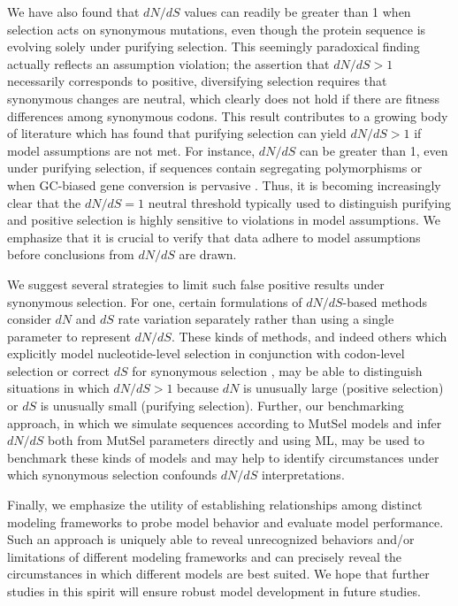 \documentclass[11pt]{article}
\begin{document}
We have also found that $dN/dS$ values can readily be greater than 1 when selection acts on synonymous mutations, even though the protein sequence is evolving solely under purifying selection. This seemingly paradoxical finding actually reflects an assumption violation; the assertion that $dN/dS > 1$ necessarily corresponds to positive, diversifying selection requires that synonymous changes are neutral, which clearly does not hold if there are fitness differences among synonymous codons. This result contributes to a growing body of literature which has found that purifying selection can yield $dN/dS > 1$ if model assumptions are not met. For instance, $dN/dS$ can be greater than 1, even under purifying selection, if sequences contain segregating polymorphisms \citep{Rochaetal2006,KryazhimskiyPlotkin2008,Mugaletal2014} or when GC-biased gene conversion is pervasive \citep{Ratnakumaretal2010}. Thus, it is becoming increasingly clear that the $dN/dS = 1$ neutral threshold typically used to distinguish purifying and positive selection is highly sensitive to violations in model assumptions. We emphasize that it is crucial to verify that data adhere to model assumptions before conclusions from $dN/dS$ are drawn.

We suggest several strategies to limit such false positive results under synonymous selection. For one, certain formulations of $dN/dS$-based methods consider $dN$ and $dS$ rate variation separately \citep{MuseGaut1994,KosakovskyPondMuse2005,Mayroseetal2007,Murrell2013} rather than using a single parameter to represent $dN/dS$. These kinds of methods, and indeed others which explicitly model nucleotide-level selection in conjunction with codon-level selection \citep{Rubinsteinetal2011} or correct $dS$ for synonymous selection \citep{Zhouetal2010}, may be able to distinguish situations in which $dN/dS>1$ because $dN$ is unusually large (positive selection) or $dS$ is unusually small (purifying selection). Further, our benchmarking approach, in which we simulate sequences according to MutSel models and infer $dN/dS$ both from MutSel parameters directly and using ML, may be used to benchmark these kinds of models and may help to identify circumstances under which synonymous selection confounds $dN/dS$ interpretations. 

Finally, we emphasize the utility of establishing relationships among distinct modeling frameworks to probe model behavior and evaluate model performance. Such an approach is uniquely able to reveal unrecognized behaviors and/or limitations of different modeling frameworks and can precisely reveal the circumstances in which different models are best suited. We hope that further studies in this spirit will ensure robust model development in future studies.
\end{document}
